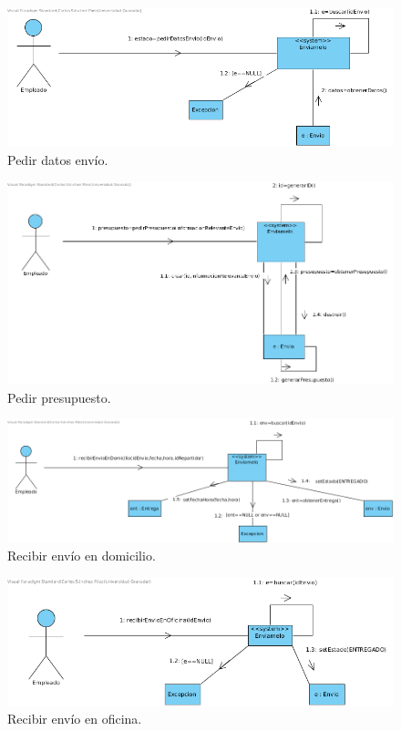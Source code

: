 \documentclass[12pt,spanish]{article}
\begin{document}
\begin{figure}[H]
\centering
\includegraphics[scale=0.5]{pedirDatosEnvio.png}
\caption{Pedir datos envío.}
\end{figure}

\begin{figure}[H]
\centering
\includegraphics[scale=0.5]{pedirPresupuesto.png}
\caption{Pedir presupuesto.}
\end{figure}

\begin{figure}[H]
\centering
\includegraphics[scale=0.5]{recibirEnvioEnDomicilio.png}
\caption{Recibir envío en domicilio.}
\end{figure}


\begin{figure}[H]
\centering
\includegraphics[scale=0.5]{recibirEnvioEnOficina.png}
\caption{Recibir envío en oficina.}
\end{figure}
\end{document}
